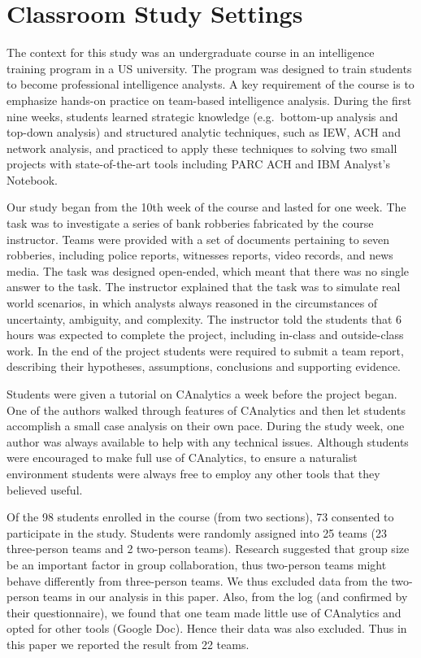\section{Classroom Study Settings}\label{classroom-study-settings}

The context for this study was an undergraduate course in an
intelligence training program in a US university. The program was
designed to train students to become professional intelligence analysts.
A key requirement of the course is to emphasize hands-on practice on
team-based intelligence analysis. During the first nine weeks, students
learned strategic knowledge (e.g.~bottom-up analysis and top-down
analysis) and structured analytic techniques, such as IEW, ACH and
network analysis, and practiced to apply these techniques to solving two
small projects with state-of-the-art tools including PARC ACH and IBM
Analyst's Notebook.

Our study began from the 10th week of the course and lasted for one
week. The task was to investigate a series of bank robberies fabricated
by the course instructor. Teams were provided with a set of documents
pertaining to seven robberies, including police reports, witnesses
reports, video records, and news media. The task was designed
open-ended, which meant that there was no single answer to the task. The
instructor explained that the task was to simulate real world scenarios,
in which analysts always reasoned in the circumstances of uncertainty,
ambiguity, and complexity. The instructor told the students that 6 hours
was expected to complete the project, including in-class and
outside-class work. In the end of the project students were required to
submit a team report, describing their hypotheses, assumptions,
conclusions and supporting evidence.

Students were given a tutorial on CAnalytics a week before the project
began. One of the authors walked through features of CAnalytics and then
let students accomplish a small case analysis on their own pace. During
the study week, one author was always available to help with any
technical issues. Although students were encouraged to make full use of
CAnalytics, to ensure a naturalist environment students were always free
to employ any other tools that they believed useful.

Of the 98 students enrolled in the course (from two sections), 73
consented to participate in the study. Students were randomly assigned
into 25 teams (23 three-person teams and 2 two-person teams). Research
suggested that group size be an important factor in group collaboration,
thus two-person teams might behave differently from three-person teams.
We thus excluded data from the two-person teams in our analysis in this
paper. Also, from the log (and confirmed by their questionnaire), we
found that one team made little use of CAnalytics and opted for other
tools (Google Doc). Hence their data was also excluded. Thus in this
paper we reported the result from 22 teams.

